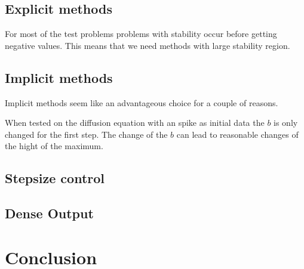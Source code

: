\documentclass{article}
\begin{document}
\subsection{Explicit methods}
For most of the test problems problems with stability occur before getting negative values. This means that we need methods with large stability region.



\subsection{Implicit methods}
Implicit methods seem like an advantageous choice for a couple of reasons.

When tested on the diffusion equation with an spike as initial data the $b$ is only changed for the first step. The change of the $b$ can lead to reasonable changes of the hight of the maximum. 

\subsection{Stepsize control}

\subsection{Dense Output}

\section{Conclusion} \label{sec:conclusion}




\printbibliography
\end{document}
